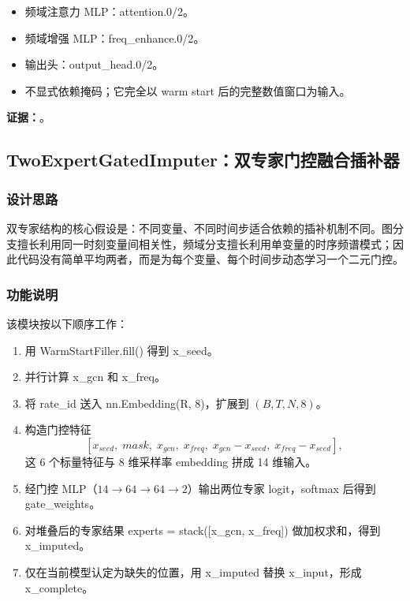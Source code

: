 \documentclass[11pt,a4paper]{ctexart}
\newcommand{\code}[1]{{\ttfamily\small #1}}
\newcommand{\evidence}[1]{\textbf{证据：}#1}
\begin{document}
\begin{itemize}
  \item 频域注意力 MLP：\code{attention.0/2}。
  \item 频域增强 MLP：\code{freq\_enhance.0/2}。
  \item 输出头：\code{output\_head.0/2}。
  \item 不显式依赖掩码；它完全以 warm start 后的完整数值窗口为输入。
\end{itemize}

\evidence{。}

\subsection{TwoExpertGatedImputer：双专家门控融合插补器}

\subsubsection{设计思路}

双专家结构的核心假设是：不同变量、不同时间步适合依赖的插补机制不同。图分支擅长利用同一时刻变量间相关性，频域分支擅长利用单变量的时序频谱模式；因此代码没有简单平均两者，而是为每个变量、每个时间步动态学习一个二元门控。

\subsubsection{功能说明}

该模块按以下顺序工作：
\begin{enumerate}
  \item 用 \code{WarmStartFiller.fill()} 得到 \code{x\_seed}。
  \item 并行计算 \code{x\_gcn} 和 \code{x\_freq}。
  \item 将 \code{rate\_id} 送入 \code{nn.Embedding(R, 8)}，扩展到 $(B,T,N,8)$。
  \item 构造门控特征
  \[
  [x_{seed},\; mask,\; x_{gcn},\; x_{freq},\; x_{gcn}-x_{seed},\; x_{freq}-x_{seed}],
  \]
  这 6 个标量特征与 8 维采样率 embedding 拼成 14 维输入。
  \item 经门控 MLP（$14 \rightarrow 64 \rightarrow 64 \rightarrow 2$）输出两位专家 logit，softmax 后得到 \code{gate\_weights}。
  \item 对堆叠后的专家结果 \code{experts = stack([x\_gcn, x\_freq])} 做加权求和，得到 \code{x\_imputed}。
  \item 仅在当前模型认定为缺失的位置，用 \code{x\_imputed} 替换 \code{x\_input}，形成 \code{x\_complete}。
\end{enumerate}
\end{document}
